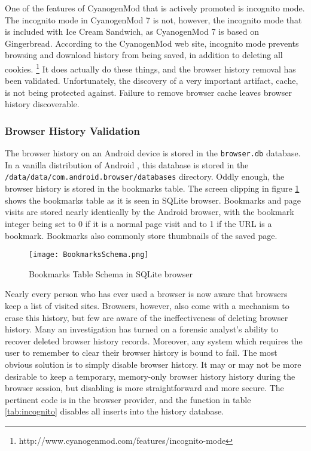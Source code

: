One of the features of CyanogenMod that is actively promoted is incognito mode. The incognito mode in CyanogenMod 7 is not, however,
the incognito mode that is included with Ice Cream Sandwich, as CyanogenMod 7 is based on Gingerbread. According to the CyanogenMod
web site, incognito mode prevents browsing and download history from being saved, in addition to deleting all cookies.
\footnote{http://www.cyanogenmod.com/features/incognito-mode} It does actually do these things, and the browser history removal has
been validated.  Unfortunately, the discovery of a very important artifact, cache, is not being protected against. Failure to remove
browser cache leaves browser history discoverable.

\subsubsection{Browser History Validation}

The browser history on an Android device is stored in the \texttt{browser.db} database.  In a vanilla distribution of Android , this
database is stored in the \texttt{/data/data/com.android.browser/databases} directory.  Oddly enough, the browser history is stored
in the bookmarks table.  The screen clipping in figure \ref{fig:bookmarkschema} shows the bookmarks table as it is seen in SQLite
browser.  Bookmarks and page visits are stored nearly identically by the Android browser, with the bookmark integer being set to 0
if it is a normal page visit and to 1 if the URL is a bookmark.  Bookmarks also commonly store thumbnails of the saved page.
\begin{figure}[htpb]
\texttt{[image: BookmarksSchema.png]}
\caption{Bookmarks Table Schema in SQLite browser}
\label{fig:bookmarkschema}
\end{figure}

Nearly every person who has ever used a browser is now aware that browsers keep a list of visited sites.  Browsers, however, also
come with a mechanism to erase this history, but few are aware of the ineffectiveness of deleting browser history.  Many an
investigation has turned on a forensic analyst's ability to recover deleted browser history records.  Moreover, any system which
requires the user to remember to clear their browser history is bound to fail.  The most obvious solution is to simply disable
browser history.  It may or may not be more desirable to keep a temporary, memory-only browser history history during the browser
session, but disabling is more straightforward and more secure.  The pertinent code is in the browser provider, and the function in
table \ref{tab:incognito} disables all inserts into the history database.

